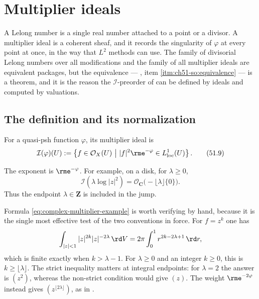 \section{Multiplier ideals}
\label{sec:ch51-multiplier}

A Lelong number is a single real number attached to a point or a divisor.
A multiplier ideal is a coherent sheaf, and it records the singularity of
$\varphi$ at every point at once, in the way that $L^2$ methods can
use.  The family of divisorial Lelong numbers over all modifications and the
family of all multiplier ideals are equivalent packages, but the equivalence
--- , item
\cref{itm:ch51-so:equivalence} --- is a theorem, and it is the reason the
$\mathcal I$-preorder of  can be defined by
ideals and computed by valuations.

\subsection{The definition and its normalization}
\label{sec:ch51-multiplier-def}

\begin{definition}
\label{def:complex-multiplier-ideal}
For a quasi-psh function $\varphi$, its multiplier ideal is
\[
 \mathcal I(\varphi)(U)
 :=\left\{f\in\mathcal O_X(U)\ \middle|\
 |f|^2\rme^{-\varphi}\in L^1_{\mathrm{loc}}(U)\right\}.
\tag{51.9}\label{eq:complex-multiplier-ideal}
\]
\end{definition}

The exponent is $\rme^{-\varphi}$.  For example, on a disk, for
$\lambda\geq0$,
\[
 \mathcal I\!\left(\lambda\log|z|^2\right)
       =\mathcal O_{\mathbf C}\bigl(-\lfloor\lambda\rfloor\{0\}\bigr).
\tag{51.10}\label{eq:complex-multiplier-example}
\]
Thus the endpoint $\lambda\in\mathbf Z$ is included in the jump.

Formula \eqref{eq:complex-multiplier-example} is worth verifying by hand,
because it is the single most effective test of the two conventions in
force.  For $f=z^k$ one has
\[
 \int_{|z|<1}|z|^{2k}|z|^{-2\lambda}\,\rd V
 =2\pi\int_0^1r^{2k-2\lambda+1}\,\rd r,
\]
which is finite exactly when $k>\lambda-1$.  For $\lambda\geq0$
and an integer $k\geq0$, this is $k\geq\lfloor\lambda\rfloor$.
The strict inequality matters at integral endpoints: for $\lambda=2$
the answer is $(z^2)$, whereas the non-strict condition would give $(z)$.
The weight $\rme^{-2\varphi}$ instead gives
$(z^{\lfloor2\lambda\rfloor})$, as in .

